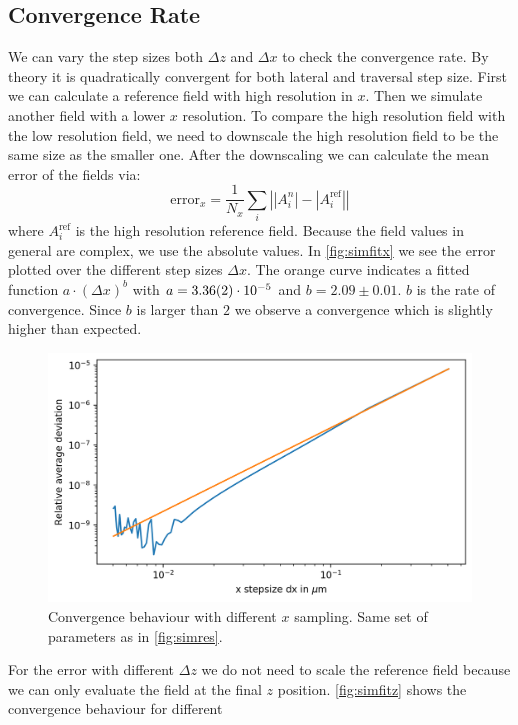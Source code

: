 \documentclass[a4paper,12pt]{scrartcl}
\begin{document}
    \subsection{Convergence Rate}
        We can vary the step sizes both $\Delta z$ and $\Delta x$ to check the convergence rate. By theory it is quadratically convergent for both lateral
        and traversal step size.
        First we can calculate a reference field with high resolution in $x$.
        Then we simulate another field with a lower $x$ resolution.
        To compare the high resolution field with the low resolution field,
        we need to downscale the high resolution field to be the same size 
        as the smaller one.
        After the downscaling we can calculate the mean 
        error of the fields via:
        \begin{equation}
            \text{error}_x = \frac{1}{N_x} \sum_{i} \left| |A_i^n| - |A_i^\text{ref}| \right| 
        \end{equation}
        where $A_i^\text{ref}$ is the high resolution reference field. Because the field values in general are complex, we use the absolute values.
        In \autoref{fig:simfitx} we see the error plotted over the different step sizes $\Delta x$. The orange curve indicates a fitted function $a \cdot ( \Delta x)^b$ with $a=\SI{3.36\pm0.02e-5}{}$ and $b= 2.09 \pm 0.01$. $b$ is the rate of convergence. Since $b$ is larger than $2$ we observe a convergence
        which is slightly higher than expected.
        \begin{figure}[H]
            \centering
            \includegraphics[width=.8\textwidth]{figures/fit_x.png}
            \caption{Convergence behaviour with different $x$ sampling.
            Same set of parameters as in \autoref{fig:simres}.}
            \label{fig:simfitx}
        \end{figure}
        For the error with different $\Delta z$ we do not need to scale the reference field because we can only evaluate the field at the final $z$ position. \autoref{fig:simfitz} shows the convergence behaviour for different
\end{document}
